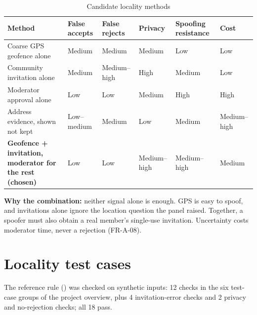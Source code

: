 \begin{table}[!htbp]
\centering
\caption{Candidate locality methods}\label{tab:candidate-locality-methods}
\begin{tabular}{@{}L{81pt}L{55pt}L{56pt}L{47pt}L{55pt}L{52pt}@{}}
\toprule
Method & False accepts & False rejects & Privacy & Spoofing resistance & Cost \\
\midrule
Coarse GPS geofence alone & Medium & Medium & Medium & Low & Low \\
Community invitation alone & Medium & Medium--high & High & Medium & Low \\
Moderator approval alone & Low & Low & Medium & High & High \\
Address evidence, shown not kept & Low--medium & Medium & Low & Medium & Medium--high \\
\textbf{Geofence + invitation, moderator for the rest (chosen)} & Low & Low & Medium--high & Medium--high & Medium \\
\bottomrule
\end{tabular}
\end{table}
\textbf{Why the combination:} neither signal alone is enough. GPS is easy to spoof, and invitations alone ignore the location question the panel raised. Together, a spoofer must also obtain a real member's single-use invitation. Uncertainty costs moderator time, never a rejection (FR-A-08).

\section{Locality test cases}\label{sec:locality-test-cases}
The reference rule () was checked on synthetic inputs: 12 checks in the six test-case groups of the project overview, plus 4 invitation-error checks and 2 privacy and no-rejection checks; all 18 pass.

